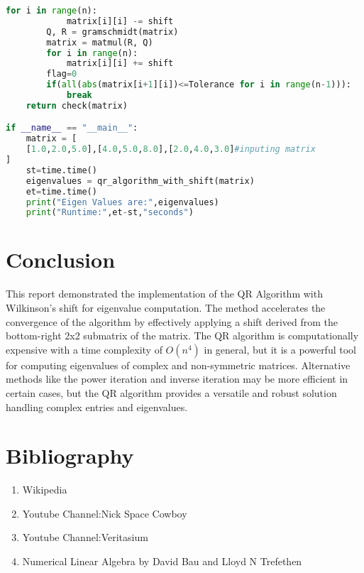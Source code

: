 \documentclass[journal]{IEEEtran}
\begin{document}
\begin{lstlisting}[language=Python, caption=QR Algorithm with Wilkinson's Shift in Python]
        for i in range(n):
            matrix[i][i] -= shift
        Q, R = gramschmidt(matrix)
        matrix = matmul(R, Q)
        for i in range(n):
            matrix[i][i] += shift
        flag=0
        if(all(abs(matrix[i+1][i])<=Tolerance for i in range(n-1))):
            break
    return check(matrix)

if __name__ == "__main__":
    matrix = [
    [1.0,2.0,5.0],[4.0,5.0,8.0],[2.0,4.0,3.0]#inputing matrix
]
    st=time.time()
    eigenvalues = qr_algorithm_with_shift(matrix)
    et=time.time()
    print("Eigen Values are:",eigenvalues)
    print("Runtime:",et-st,"seconds")


\end{lstlisting}

\section{Conclusion}
This report demonstrated the implementation of the QR Algorithm with Wilkinson's shift for eigenvalue computation. The method accelerates the convergence of the algorithm by effectively applying a shift derived from the bottom-right 2x2 submatrix of the matrix. The QR algorithm is computationally expensive with a time complexity of $O(n^4)$ in general, but it is a powerful tool for computing eigenvalues of complex and non-symmetric matrices. Alternative methods like the power iteration and inverse iteration may be more efficient in certain cases, but the QR algorithm provides a versatile and robust solution handling complex entries and eigenvalues.
\section{Bibliography}
\begin{enumerate}
    \item Wikipedia
    \item Youtube Channel:Nick Space Cowboy
    \item Youtube Channel:Veritasium
    \item Numerical Linear Algebra by David Bau and Lloyd N Trefethen
\end{enumerate}
\end{document}
